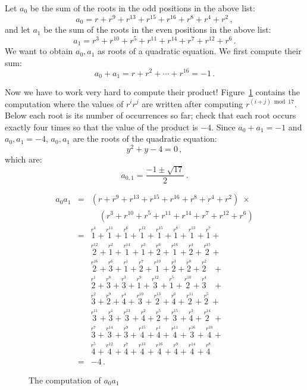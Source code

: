 \documentclass[11pt,a4paper]{article}
\newenvironment{form}[1]{%
\begin{displaymath}%
\renewcommand{\arraystretch}{#1}%
\begin{array}{lcl}}%
{\end{array}%
\end{displaymath}%
}
\newcommand*{\occ}[2]{%
  \stackrel{%
    \textstyle r^{#1}}%
    {\!\!\!\scriptscriptstyle #2}}
\begin{document}
Let $a_0$ be the sum of the roots in the odd positions in the above list:
\[
a_0=r + r^9 + r^{13} +r^{15} +r^{16} + r^8+r^4+r^2\,,
\]
and let $a_1$ be the sum of the roots in the even positions in the above list:
\[
a_1=r^3 + r^{10} + r^{5} +r^{11} +r^{14} + r^7+r^{12}+r^6\,.
\]
We want to obtain $a_0,a_1$ as roots of a quadratic equation. We first compute their sum:
\[
a_0+a_1=r + r^2 + \cdots +r^{16}=-1\,.
\]

Now we have to work very hard to compute their product! Figure~\ref{fig.a0a1} contains the computation where the values of $r^ir^j$ are written after computing $r^{(i+j) \bmod 17}$. Below each root is its number of occurrences so far; check that each root occurs exactly four times so that the value of the product is $-4$. Since $a_0+a_1=-1$ and $a_0,a_1=-4$, $a_0,a_1$ are the roots of the quadratic equation:
\[
y^2+y-4=0\,,
\]
which are:
\[
a_{0,1} = \frac{-1\pm\sqrt{17}}{2}\,.
\]
\begin{figure}[tb]
\begin{form}{1.5}
a_0a_1&=&(r + r^9 + r^{13} +r^{15} +r^{16} + r^8+r^4+r^2)\;\times\\

&&\quad (r^3 + r^{10} + r^{5} +r^{11} +r^{14} + r^7+r^{12}+r^6)\\

&=&\occ{4}{1} + \occ{11}{1} + \occ{6}{1} + \occ{12}{1} + \occ{15}{1} + \occ{8}{1} + \occ{13}{1} + \occ{7}{1} +\\

&&\occ{12}{2} + \occ{2}{1} + \occ{14}{1} + \occ{3}{1} + \occ{6}{2} + \occ{16}{1} + \occ{4}{2} + \occ{15}{2} +\\

&&\occ{16}{2} + \occ{6}{3} + \occ{1}{1} + \occ{7}{2} + \occ{10}{1} + \occ{3}{2} + \occ{8}{2} + \occ{2}{2}\;\;\: +\\

&&\occ{1}{2} + \occ{8}{3} + \occ{3}{3} + \occ{9}{1} + \occ{12}{3} + \occ{5}{1} + \occ{10}{2} + \occ{4}{3}\;\;\: +\\

&&\occ{2}{3} + \occ{9}{2} + \occ{4}{4} + \occ{10}{3} + \occ{13}{2} + \occ{6}{4} + \occ{11}{2} + \occ{5}{2} \:+\\

&&\occ{11}{3} + \occ{1}{3} + \occ{13}{3} + \occ{2}{4} + \occ{5}{2} + \occ{15}{3} + \occ{3}{4} + \occ{14}{2} \;+\\

&&\occ{7}{3} + \occ{14}{3} + \occ{9}{3} + \occ{15}{4} + \occ{1}{4} + \occ{11}{4} + \occ{16}{3} + \occ{10}{4} +\\

&&\occ{5}{4} + \occ{12}{4} + \occ{7}{4} + \occ{13}{4} + \occ{16}{4} + \occ{9}{4} + \occ{14}{4} + \occ{8}{4}\\
&=&-4\,.
\end{form}\vspace{-2em}
\caption{The computation of $a_0a_1$}\label{fig.a0a1}
\end{figure}
\end{document}
